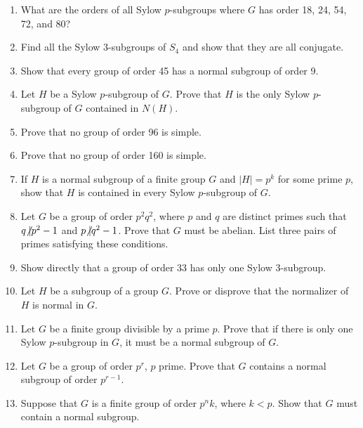  
{\small
\begin{enumerate}

\item
What are the orders of all Sylow $p$-subgroups where $G$ has order 18, 24, 54, 72, and 80? 
 
\item
Find all the Sylow 3-subgroups of $S_4$ and show that they are all conjugate. 
 
\item
Show that every group of order 45 has a normal subgroup of order 9.
 
\item
Let $H$ be a Sylow $p$-subgroup of $G$.  Prove that $H$ is the only Sylow $p$-subgroup of $G$ contained in $N(H)$. 
 
\item
Prove that no group of order 96 is simple.

\item
Prove that no group of order 160 is simple.

\item
If $H$ is a normal subgroup of a finite group $G$ and $|H| = p^k$ for some prime $p$, show that $H$ is contained in every Sylow $p$-subgroup of $G$. 

\item
Let $G$ be a group of order $p^2 q^2$, where $p$ and $q$ are distinct primes such that $q {\not{\mid}} p^2 - 1$ and $p {\not{\mid}} q^2 - 1$. Prove that $G$ must be abelian.  List three pairs of primes satisfying these  conditions. 

\item
Show directly that a group of order 33 has only one Sylow 3-subgroup. 

\item
Let $H$ be a subgroup of a group $G$.  Prove or disprove that the normalizer of $H$ is normal in $G$. 
 
 
\item
Let $G$ be a finite group divisible by a prime $p$.  Prove that if there is only one Sylow $p$-subgroup in $G$, it must be a normal subgroup of $G$. 
 
\item
Let $G$ be a group of order $p^r$, $p$ prime. Prove that $G$ contains
a normal subgroup of order $p^{r-1}$. 
 
\item
Suppose that $G$ is a finite group of order $p^n k$, where $k < p$.
Show that $G$ must contain a normal subgroup.  
 

\end{enumerate}}
